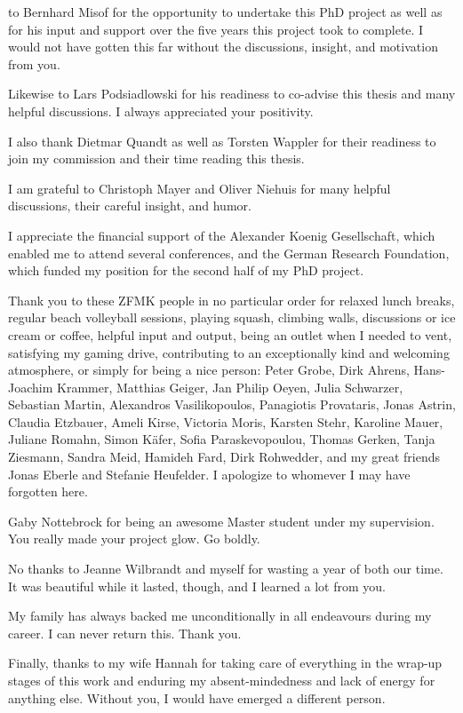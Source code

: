 
 to Bernhard Misof for the opportunity to
undertake this PhD project as well as for his input and support over the
five years this project took to complete.  I would not have gotten this
far without the discussions, insight, and motivation from you.

Likewise to Lars Podsiadlowski for his readiness to co-advise this
thesis and many helpful discussions.  I always appreciated your
positivity.

I also thank Dietmar Quandt as well as Torsten Wappler for their
readiness to join my commission and their time reading this thesis.

I am grateful to Christoph Mayer and Oliver Niehuis for many helpful
discussions, their careful insight, and humor.

I appreciate the financial support of the Alexander Koenig Gesellschaft,
which enabled me to attend several conferences, and the German Research
Foundation, which funded my position for the second half of my PhD
project.

Thank you to these ZFMK people in no particular order for relaxed lunch
breaks, regular beach volleyball sessions, playing squash, climbing
walls, discussions or ice cream or coffee, helpful input and output,
being an outlet when I needed to vent, satisfying my gaming drive,
contributing to an exceptionally kind and welcoming atmosphere, or
simply for being a nice person:
%
Peter Grobe, Dirk Ahrens, Hans-Joachim Krammer, Matthias Geiger, Jan
Philip Oeyen, Julia Schwarzer, Sebastian Martin, Alexandros
Vasilikopoulos, Panagiotis Provataris, Jonas Astrin, Claudia Etzbauer,
Ameli Kirse, Victoria Moris, Karsten Stehr, Karoline Mauer, Juliane
Romahn, Simon K\"afer, Sofia Paraskevopoulou, Thomas Gerken, Tanja
Ziesmann, Sandra Meid, Hamideh Fard, Dirk Rohwedder, and my great
friends Jonas Eberle and Stefanie Heufelder.  I apologize to whomever I
may have forgotten here.

Gaby Nottebrock for being an awesome Master student under my
supervision.  You really made your project glow.  Go boldly.

No thanks to Jeanne Wilbrandt and myself for wasting a year of both our
time.  It was beautiful while it lasted, though, and I learned a lot
from you.

My family has always backed me unconditionally in all endeavours during
my career.  I can never return this.  Thank you.

Finally, thanks to my wife Hannah for taking care of everything in the
wrap-up stages of this work and enduring my absent-mindedness and lack
of energy for anything else.  Without you, I would have emerged a
different person.
